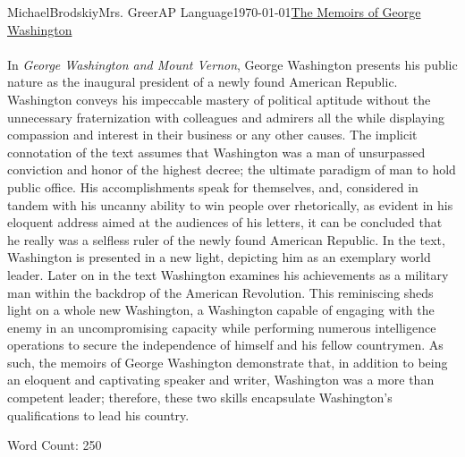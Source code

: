 \documentclass[12pt,letterpaper]{article}
\begin{document}
\begin{mla}{Michael}{Brodskiy}{Mrs. Greer}{AP Language}{\today}{\underline{The Memoirs of George Washington}} 

  \begin{justifying}

    \paragraph{} In \emph{George Washington and Mount Vernon}, George Washington presents his public nature as the inaugural president of a newly found American Republic. Washington conveys his impeccable mastery of political aptitude without the unnecessary fraternization with colleagues and admirers all the while displaying compassion and interest in their business or any other causes. The implicit connotation of the text assumes that Washington was a man of unsurpassed conviction and honor of the highest decree; the ultimate paradigm of man to hold public office. His accomplishments speak for themselves, and, considered in tandem with his uncanny ability to win people over rhetorically, as evident in his eloquent address aimed at the audiences of his letters, it can be concluded that he really was a selfless ruler of the newly found American Republic. In the text, Washington is presented in a new light, depicting him as an exemplary world leader. Later on in the text Washington examines his achievements as a military man within the backdrop of the American Revolution. This reminiscing sheds light on a whole new Washington, a Washington capable of engaging with the enemy in an uncompromising capacity while performing numerous intelligence operations to secure the independence of himself and his fellow countrymen. As such, the memoirs of George Washington demonstrate that, in addition to being an eloquent and captivating speaker and writer, Washington was a more than competent leader; therefore, these two skills encapsulate Washington's qualifications to lead his country.
      
\end{justifying}
\centering Word Count: 250

\end{mla}
\end{document}
